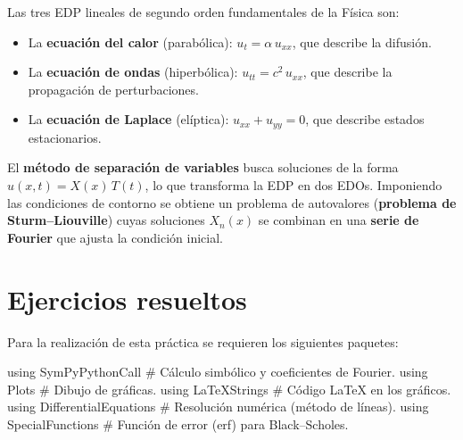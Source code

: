 \documentclass[
  spanish,
  a4paper,
]{scrreport}
\newenvironment{Shaded}{\begin{snugshade}}{\end{snugshade}}
\newcommand{\BuiltInTok}[1]{\textcolor[rgb]{0.00,0.23,0.31}{#1}}
\newcommand{\CommentTok}[1]{\textcolor[rgb]{0.37,0.37,0.37}{#1}}
\newcommand{\ImportTok}[1]{\textcolor[rgb]{0.00,0.46,0.62}{#1}}
\providecommand{\tightlist}{%
  \setlength{\itemsep}{0pt}\setlength{\parskip}{0pt}}
\theoremstyle{definition}
\theoremstyle{remark}
\begin{document}
Las tres EDP lineales de segundo orden fundamentales de la Física son:

\begin{itemize}
\tightlist
\item
  La \textbf{ecuación del calor} (parabólica): \(u_t = \alpha\,u_{xx}\),
  que describe la difusión.
\item
  La \textbf{ecuación de ondas} (hiperbólica): \(u_{tt} = c^2\,u_{xx}\),
  que describe la propagación de perturbaciones.
\item
  La \textbf{ecuación de Laplace} (elíptica): \(u_{xx} + u_{yy} = 0\),
  que describe estados estacionarios.
\end{itemize}

El \textbf{método de separación de variables} busca soluciones de la
forma \(u(x,t) = X(x)\,T(t)\), lo que transforma la EDP en dos EDOs.
Imponiendo las condiciones de contorno se obtiene un problema de
autovalores (\textbf{problema de Sturm--Liouville}) cuyas soluciones
\(X_n(x)\) se combinan en una \textbf{serie de Fourier} que ajusta la
condición inicial.

\section{Ejercicios resueltos}\label{ejercicios-resueltos-7}

Para la realización de esta práctica se requieren los siguientes
paquetes:

\begin{Shaded}
\begin{Highlighting}[]
\ImportTok{using} \BuiltInTok{SymPyPythonCall}        \CommentTok{\# Cálculo simbólico y coeficientes de Fourier.}
\ImportTok{using} \BuiltInTok{Plots}                  \CommentTok{\# Dibujo de gráficas.}
\ImportTok{using} \BuiltInTok{LaTeXStrings}           \CommentTok{\# Código LaTeX en los gráficos.}
\ImportTok{using} \BuiltInTok{DifferentialEquations}  \CommentTok{\# Resolución numérica (método de líneas).}
\ImportTok{using} \BuiltInTok{SpecialFunctions}       \CommentTok{\# Función de error (erf) para Black–Scholes.}
\end{Highlighting}
\end{Shaded}
\end{document}
